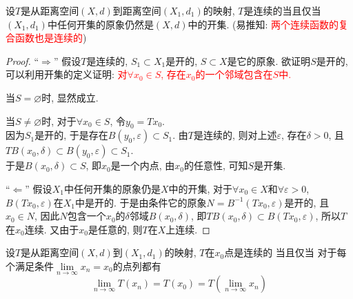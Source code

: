 \documentclass[lang=cn,10pt]{gorgeousnbook}
\numberwithin{equation}{section}%
\numberwithin{figure}{section}%
\begin{document}
\begin{theorem}
设$T$是从距离空间$(X,d)$到距离空间$(X_1,d_1)$的映射, $T$是连续的当且仅当$(X_1,d_1)$中任何开集的原象仍然是$(X,d)$中的开集. (易推知: \textcolor{red}{两个连续函数的复合函数也是连续的})
\end{theorem}
\begin{proof}
“$\Rightarrow$” 假设$T$是连续的, $S_1\subset X_1$是开的, $S\subset X$是它的原象. 欲证明$S$是开的, 可以利用开集的定义证明: \textcolor{red}{对$\forall x_0\in S$, 存在$x_0$的一个邻域包含在$S$中.}
\par
当$S=\varnothing $时, 显然成立. 
\par
当$S\neq \varnothing $时, 对于$\forall x_0\in S$, 令$y_0 = Tx_0$. \\
因为$S_1$是开的, 于是存在$B(y_0,\varepsilon) \subset S_1 $. 由$T$是连续的, 则对上述$\varepsilon$, 存在$\delta >0 $, 且$TB(x_0,\delta)\subset B(y_0,\varepsilon)\subset S_1$.\\
于是$B(x_0,\delta)\subset S$, 即$x_0$是一个内点, 由$x_0$的任意性, 可知$S$是开集. 

“$\Leftarrow$”  假设$X_1$中任何开集的原象仍是$X$中的开集, 对于$\forall x_0 \in X$和$\forall \varepsilon>0$, $B(Tx_0,\varepsilon)$在$X_1$中是开的. 于是由条件它的原象$N = B^{-1}(Tx_0,\varepsilon)$是开的, 且$x_0\in N$, 因此$N$包含一个$x_0$的$\delta $邻域$B(x_0,\delta)$, 即$TB(x_0,\delta)\subset B(Tx_0,\varepsilon)$, 所以$T$在$x_0$连续. 又由于$x_0$是任意的, 则$T$在$X$上连续. 
\end{proof}

\begin{theorem}
设$T$是从距离空间$(X,d)$到$(X_1,d_1)$的映射, $T$在$x_0$点是连续的 当且仅当 对于每个满足条件$\underset{n\rightarrow \infty}{\lim}x_n=x_0$的点列都有
\begin{equation}
\underset{n\rightarrow \infty}{\lim}T\left( x_n \right) =T\left( x_0 \right) =T\left( \underset{n\rightarrow \infty}{\lim}x_n \right) 
\end{equation}
\end{theorem}
\end{document}
